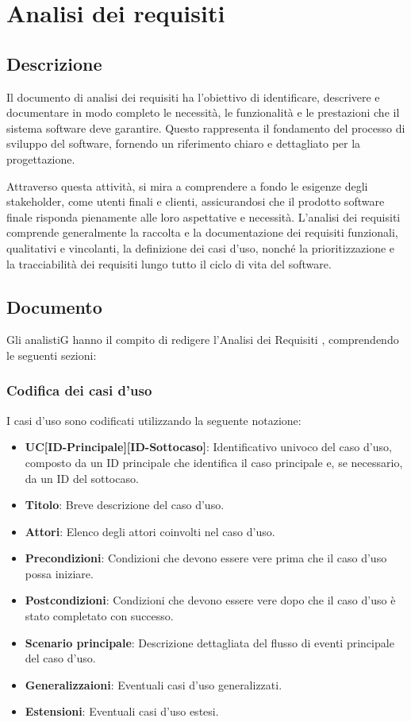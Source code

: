 \section{Analisi dei requisiti}

\subsection{Descrizione}
Il documento di analisi dei requisiti ha l'obiettivo di identificare,
descrivere e documentare in modo completo le necessità, 
le funzionalità e le prestazioni che il sistema software deve garantire. 
Questo rappresenta il fondamento del processo di sviluppo del software, 
fornendo un riferimento chiaro e dettagliato per la progettazione.

Attraverso questa attività, si mira a comprendere a fondo le esigenze degli stakeholder, 
come utenti finali e clienti, assicurandosi che il prodotto software finale risponda 
pienamente alle loro aspettative e necessità. L’analisi dei requisiti comprende 
generalmente la raccolta e la documentazione dei requisiti funzionali, 
qualitativi e vincolanti, la definizione dei casi d’uso, 
nonché la prioritizzazione e la tracciabilità dei requisiti lungo tutto il ciclo
di vita del software.

\subsection{Documento}
Gli analistiG hanno il compito di redigere l’Analisi dei Requisiti , comprendendo le seguenti
sezioni:



\subsubsection{Codifica dei casi d'uso}
I casi d'uso sono codificati utilizzando la seguente notazione:

\begin{itemize}
    \item \textbf{UC[ID-Principale][ID-Sottocaso]}: Identificativo univoco del caso d'uso, composto da un ID principale che identifica il caso principale e, se necessario, da un ID del sottocaso.
    \item \textbf{Titolo}: Breve descrizione del caso d'uso.
    \item \textbf{Attori}: Elenco degli attori coinvolti nel caso d'uso.
    \item \textbf{Precondizioni}: Condizioni che devono essere vere prima che il caso d'uso possa iniziare.
    \item \textbf{Postcondizioni}: Condizioni che devono essere vere dopo che il caso d'uso è stato completato con successo.
    \item \textbf{Scenario principale}: Descrizione dettagliata del flusso di eventi principale del caso d'uso.
    \item \textbf{Generalizzaioni}: Eventuali casi d'uso generalizzati.
    \item \textbf{Estensioni}: Eventuali casi d'uso estesi.
\end{itemize}